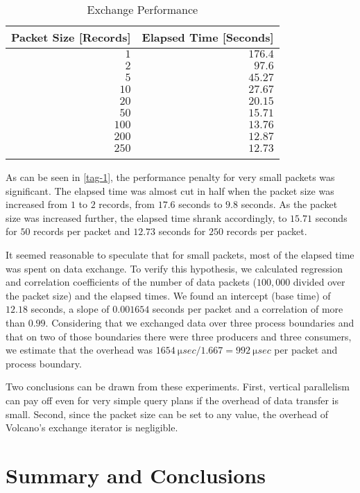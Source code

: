 \documentclass[a4paper,11pt,notitlepage,twoside,openright]{article}
\begin{document}
\begin{table}[hbtp]
  \centering
  \begin{tabu}{rr}
    \toprule{}
    Packet Size [Records] & Elapsed Time [Seconds]\\
    \midrule{}
    $1$ & $176.4$\\
    $2$ & $97.6$\\
    $5$ & $45.27$\\
    $10$ & $27.67$\\
    $20$ & $20.15$\\
    $50$ & $15.71$\\
    $100$ & $13.76$\\
    $200$ & $12.87$\\
    $250$ & $12.73$\\
    \bottomrule{}
  \end{tabu}
  \caption{Exchange Performance\label{tab-1}}
\end{table}

As can be seen in \autoref{tag-1}, the performance penalty
for very small packets was significant. The elapsed time
was almost cut in half when the packet size was increased
from $1$ to $2$ records, from $17.6$ seconds to $9.8$ seconds. As
the packet size was increased further, the elapsed time
shrank accordingly, to $15.71$ seconds for $50$ records per
packet and $12.73$ seconds for $250$ records per packet.

It seemed reasonable to speculate that for small packets,
most of the elapsed time was spent on data exchange.
To verify this hypothesis, we calculated regression and
correlation coefficients of the number of data packets
($100,000$ divided over the packet size) and the elapsed
times. We found an intercept (base time) of $12.18$ seconds,
a slope of $0.001654$ seconds per packet and a correlation
of more than $0.99$. Considering that we exchanged data
over three process boundaries and that on two of those
boundaries there were three producers and three consumers,
we estimate that the overhead was $\SI{1654}{\micro sec} / 1.667 = \SI{992}{\micro sec}$
per packet and process boundary.

Two conclusions can be drawn from these experiments.
First, vertical parallelism can pay off even for very
simple query plans if the overhead of data transfer is small.
Second, since the packet size can be set to any value, the
overhead of Volcano's exchange iterator is negligible.

\section{Summary and Conclusions}
\end{document}
